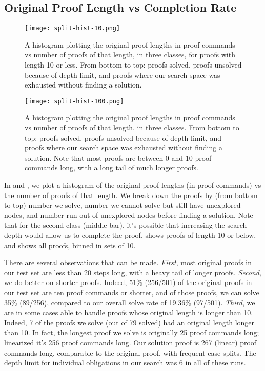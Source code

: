 \documentclass[sigplan,screen]{acmart}
\renewcommand{\>}{\quad}
\begin{document}
\subsection{Original Proof Length vs Completion Rate}
\label{ssec:length-completion}

\begin{figure}
\texttt{[image: split-hist-10.png]}
\caption{A histogram plotting the original proof lengths in proof
  commands vs number of proofs of that length, in three classes, for
  proofs with length 10 or less. From bottom to top: proofs solved,
  proofs unsolved because of depth limit, and proofs where our search
  space was exhausted without finding a solution.}
\label{fig:orig-split-hist-10}
\end{figure}
\begin{figure}
\texttt{[image: split-hist-100.png]}
\caption{A histogram plotting the original proof lengths in proof
  commands vs number of proofs of that length, in three classes. From
  bottom to top: proofs solved, proofs unsolved because of depth
  limit, and proofs where our search space was exhausted without
  finding a solution. Note that most proofs are between 0 and 10 proof
  commands long, with a long tail of much longer proofs.}
\label{fig:orig-split-hist-100}
\end{figure}

In  and , we plot a histogram
  of the original proof lengths (in proof commands)
  vs the number of proofs of that length.
We break down the proofs by (from bottom to top)
  number we solve,
  number we cannot solve but still have unexplored nodes,
  and number run out of unexplored nodes before finding a solution.
Note that for the second class (middle bar), it's
  possible that increasing the search depth would allow us to complete
  the proof.
 shows proofs of length 10 or below, and  shows all proofs, binned in sets of 10.

There are several observations that can be made.
\emph{First}, most original proofs in our test set are less than 20 steps long, with a heavy tail of longer proofs.
\emph{Second}, we do better on shorter proofs.
Indeed, 51\% (256/501) of the original proofs in our test set are ten proof commands or shorter, and of those proofs, we can solve 35\% (89/256), compared to our overall solve rate of 19.36\% (97/501).
\emph{Third}, we are in some cases able to handle proofs whose original length is longer than 10. Indeed, 7 of the proofs we solve (out of 79 solved) had an original length longer than 10.
In fact, the longest proof we solve is originally 25 proof commands long;
  linearized it's 256 proof commands long.
Our solution proof is 267 (linear) proof commands long, comparable to the original proof,
  with frequent case splits.
The depth limit for individual obligations in our search was 6 in all of these runs.
\end{document}
